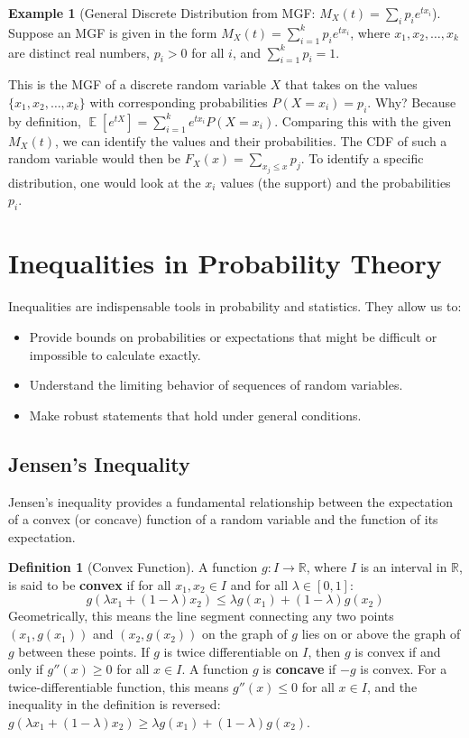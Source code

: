 \documentclass[11pt, letterpaper]{article}
\theoremstyle{plain} %
\theoremstyle{definition} %
\newtheorem{definition}[theorem]{Definition}
\newtheorem{example}[theorem]{Example}
\theoremstyle{remark} %
\DeclareMathOperator{\E}{\mathbb{E}}
\newcommand{\R}{\mathbb{R}}
\begin{document}
\begin{example}[General Discrete Distribution from MGF: $M_X(t) = \sum_{i} p_i e^{tx_i}$]
\label{ex:mgf_general_discrete}
Suppose an MGF is given in the form $M_X(t) = \sum_{i=1}^k p_i e^{tx_i}$, where $x_1, x_2, \dots, x_k$ are distinct real numbers, $p_i > 0$ for all $i$, and $\sum_{i=1}^k p_i = 1$.

This is the MGF of a discrete random variable $X$ that takes on the values $\{x_1, x_2, \dots, x_k\}$ with corresponding probabilities $P(X=x_i) = p_i$.
Why? Because by definition, $\E[e^{tX}] = \sum_{i=1}^k e^{tx_i} P(X=x_i)$. Comparing this with the given $M_X(t)$, we can identify the values and their probabilities.
The CDF of such a random variable would then be $F_X(x) = \sum_{x_j \le x} p_j$.
To identify a specific distribution, one would look at the $x_i$ values (the support) and the probabilities $p_i$.
\end{example}

\section{Inequalities in Probability Theory}
\label{sec:inequalities}

Inequalities are indispensable tools in probability and statistics. They allow us to:
\begin{itemize}
    \item Provide bounds on probabilities or expectations that might be difficult or impossible to calculate exactly.
    \item Understand the limiting behavior of sequences of random variables.
    \item Make robust statements that hold under general conditions.
\end{itemize}

\subsection{Jensen's Inequality}
\label{subsec:jensen}

Jensen's inequality provides a fundamental relationship between the expectation of a convex (or concave) function of a random variable and the function of its expectation.

\begin{definition}[Convex Function]
A function $g: I \to \R$, where $I$ is an interval in $\R$, is said to be \textbf{convex} if for all $x_1, x_2 \in I$ and for all $\lambda \in [0,1]$:
\[ g(\lambda x_1 + (1-\lambda)x_2) \le \lambda g(x_1) + (1-\lambda)g(x_2) \]
Geometrically, this means the line segment connecting any two points $(x_1, g(x_1))$ and $(x_2, g(x_2))$ on the graph of $g$ lies on or above the graph of $g$ between these points.
If $g$ is twice differentiable on $I$, then $g$ is convex if and only if $g''(x) \ge 0$ for all $x \in I$.
A function $g$ is \textbf{concave} if $-g$ is convex. For a twice-differentiable function, this means $g''(x) \le 0$ for all $x \in I$, and the inequality in the definition is reversed: $g(\lambda x_1 + (1-\lambda)x_2) \ge \lambda g(x_1) + (1-\lambda)g(x_2)$.
\end{definition}
\end{document}
